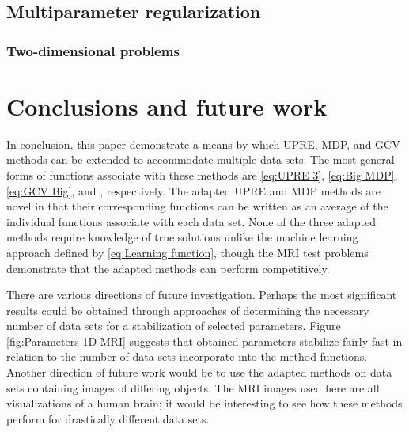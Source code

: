 \documentclass[12pt]{article}
\begin{document}
\subsection{Multiparameter regularization}

\subsubsection{Two-dimensional problems}

\section{Conclusions and future work} \label{sec:Conclusion}
In conclusion, this paper demonstrate a means by which UPRE, MDP, and GCV methods can be extended to accommodate multiple data sets. The most general forms of functions associate with these methods are \eqref{eq:UPRE 3}, \eqref{eq:Big MDP}, \eqref{eq:GCV Big}, and , respectively. The adapted UPRE and MDP methods are novel in that their corresponding functions can be written as an average of the individual functions associate with each data set. None of the three adapted methods require knowledge of true solutions unlike the machine learning approach defined by \eqref{eq:Learning function}, though the MRI test problems demonstrate that the adapted methods can perform competitively. \par
There are various directions of future investigation. Perhaps the most significant results could be obtained through approaches of determining the necessary number of data sets for a stabilization of selected parameters. Figure \ref{fig:Parameters 1D MRI} suggests that obtained parameters stabilize fairly fast in relation to the number of data sets incorporate into the method functions. Another direction of future work would be to use the adapted methods on data sets containing images of differing objects. The MRI images used here are all visualizations of a human brain; it would be interesting to see how these methods perform for drastically different data sets.



\end{document}
